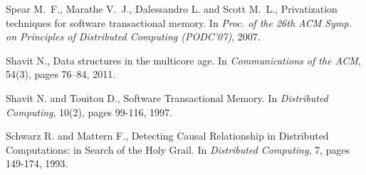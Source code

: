 \begin{thebibliography}{99}
{%


Spear M.~F., Marathe V.~J., Dalessandro L. and Scott M.~L.,
\newblock Privatization techniques for software transactional memory.
\newblock In {\em Proc. of the 26th ACM Symp. on Principles of
  Distributed Computing (PODC'07)}, 2007.








Shavit N.,
\newblock Data structures in the multicore age.
\newblock In {\em Communications of the ACM}, 54(3), pages 76--84, 2011.

% 



Shavit N. and Touitou D., 
\newblock Software Transactional Memory. 
\newblock In {\it Distributed  Computing}, 10(2), pages 99-116, 1997. 


% 
% 
% 
% 
% 



Schwarz R. and Mattern F., 
\newblock Detecting  Causal Relationship in Distributed  Computations: in  Search of
the Holy Grail. 
\newblock In {\it Distributed Computing}, 7, pages 149-174, 1993. 


}
\end{thebibliography}

